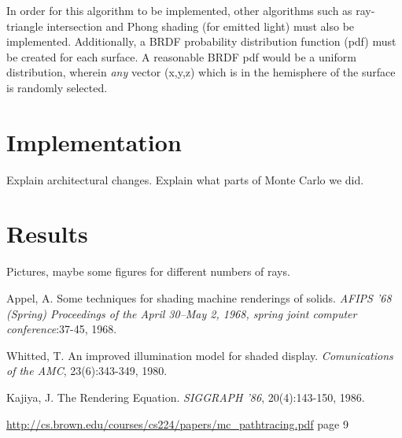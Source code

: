 \documentclass[journal]{IEEEtran}
\begin{document}
In order for this algorithm to be implemented, other algorithms such as ray-triangle intersection and Phong shading (for emitted light) must also be implemented. 
Additionally, a BRDF probability distribution function (pdf) must be created for each surface. A reasonable BRDF pdf would be a uniform distribution, wherein \emph{any} 
vector (x,y,z) which is in the hemisphere of the surface is randomly selected.

\section{Implementation}
Explain architectural changes.
Explain what parts of Monte Carlo we did.

\section{Results}
Pictures, maybe some figures for different numbers of rays.



\begin{thebibliography}{4}

Appel, A. Some techniques for shading machine renderings of solids. \emph{AFIPS '68 (Spring) Proceedings of the April 30--May 2, 1968, spring joint computer conference}:37-45, 1968.

Whitted, T. An improved illumination model for shaded display. \emph{Comunications of the AMC}, 23(6):343-349, 1980.

Kajiya, J. The Rendering Equation. \emph{SIGGRAPH '86}, 20(4):143-150, 1986.

\url{http://cs.brown.edu/courses/cs224/papers/mc_pathtracing.pdf} page 9

\end{thebibliography}

\end{document}
